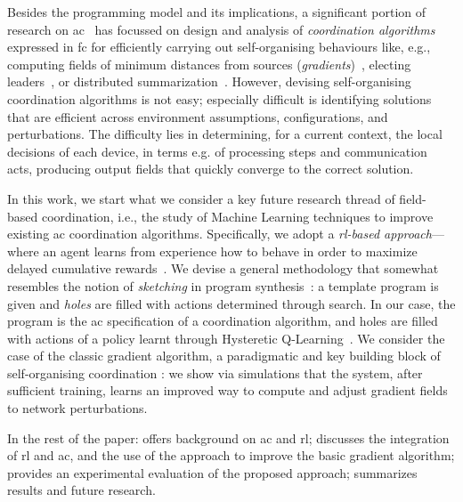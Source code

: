Besides the programming model and its implications,
 a significant portion of research on \ac{ac}~\cite{DBLP:journals/jlap/ViroliBDACP19} has focussed
 on design and analysis of \emph{coordination algorithms} expressed in \ac{fc}
 for efficiently carrying out self-organising behaviours
 like, e.g., computing fields of minimum distances from sources (\emph{gradients})~\cite{DBLP:conf/ipsn/NagpalSB03,DBLP:journals/pervasive/MameiZL04,DBLP:conf/saso/AudritoCDV17},
 electing leaders~\cite{DBLP:conf/saso/MoBD18},
 or %
 distributed summarization~\cite{DBLP:journals/cee/AudritoCDPV21}.
%
However, devising self-organising coordination algorithms is not easy; especially difficult is identifying solutions
 that are efficient across environment assumptions, configurations, and perturbations.
%
The difficulty lies in determining, 
 for a current context,
 the local decisions of each device, 
 in terms e.g. of processing steps and communication acts,
 producing output fields that quickly converge to the correct solution.

In this work, we start what we consider a key future research thread of field-based coordination, i.e.,
 the study of Machine Learning techniques 
 to improve existing \ac{ac} coordination algorithms.
%
Specifically, we adopt a \emph{\ac{rl}-based approach}---where an agent learns from experience
 how to behave in order to maximize delayed cumulative rewards~\cite{sutton2018reinforcement-learning}.
%
We devise a general methodology that somewhat resembles the notion of \emph{sketching} in program synthesis~\cite{solar2008program-synthesis-sketching}:
 a template program is given and \emph{holes} are filled with actions determined through search.
%
In our case, the program is the \ac{ac} specification of a coordination algorithm, and holes are filled with actions of a policy learnt through Hysteretic Q-Learning~\cite{DBLP:conf/iros/MatignonLF07}.
%
We consider the case of the classic gradient algorithm, a paradigmatic and key building block of self-organising coordination \cite{DBLP:journals/jlap/ViroliBDACP19,beal2013organizing-aggregate,DBLP:journals/corr/abs-2201-03473}: we show via simulations 
 that the system, after sufficient training,
 learns an improved way to compute and adjust gradient fields to network perturbations.

In the rest of the paper: 
 offers background on \ac{ac} and \ac{rl};
%
 discusses the integration of \ac{rl} and \ac{ac}, and the use of the approach to improve the basic gradient algorithm;
%
 provides an experimental evaluation of the proposed approach;
%
 summarizes results and future research.


